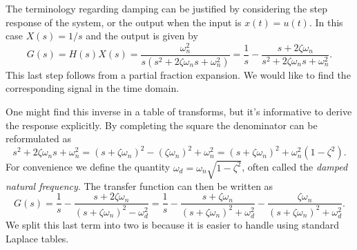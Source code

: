 \documentclass[10pt]{beamer}
\begin{document}
The terminology regarding damping can be justified by considering the step response of the system, or the output when the input is $x(t) = u(t)$.  In this case $X(s) = 1/s$ and the output is given by
\begin{equation*}
  G(s) = H(s) X(s) = \frac{\omega_n^2}{s(s^2 + 2 \zeta \omega_n s + \omega_n^2)}
  = \frac{1}{s} - \frac{s + 2 \zeta \omega_n}{s^2 + 2 \zeta \omega_n s + \omega_n^2}.
\end{equation*}
This last step follows from a partial fraction expansion.  We would like to find the corresponding signal in the time domain.

One might find this inverse in a table of transforms, but it's informative to derive the response explicitly.  By completing the square the denominator can be reformulated as
\begin{equation*}
  s^2 + 2 \zeta \omega_n s + \omega_n^2 = (s + \zeta \omega_n)^2 - (\zeta \omega_n)^2 + \omega_n^2
  = (s + \zeta \omega_n)^2 + \omega_n^2 (1 - \zeta^2).
\end{equation*}
For convenience we define the quantity $\omega_d = \omega_n \sqrt{1 - \zeta^2}$, often called the {\em damped natural frequency}.  The transfer function can then be written as
\begin{equation*}
  G(s) = \frac{1}{s} - \frac{s + 2 \zeta \omega_n}{(s + \zeta \omega_n)^2 - \omega_d^2}
  = \frac{1}{s} - \frac{s + \zeta \omega_n}{(s + \zeta \omega_n)^2 + \omega_d^2} 
  - \frac{\zeta \omega_n}{(s + \zeta \omega_n)^2 + \omega_d^2}.
\end{equation*}
We split this last term into two is because it is easier to handle using standard Laplace tables.
\end{document}
